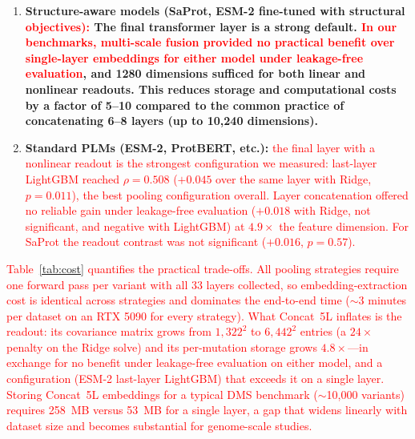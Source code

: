 \documentclass[11pt,a4paper]{article}
\newcommand{\rev}[1]{\textcolor{red}{#1}}
\begin{document}
\begin{enumerate}
    \item \textbf{Structure-aware models (SaProt, ESM-2 fine-tuned with structural
\textcolor{red}{    objectives):} The final transformer layer is a strong default. \rev{In our
    benchmarks, multi-scale fusion provided no practical benefit over single-layer
    embeddings for either model under leakage-free evaluation}, and 1280 dimensions
    sufficed for both linear and nonlinear readouts.
    This reduces
    storage and computational costs by a factor of 5--10 compared to the common
    practice of concatenating 6--8 layers (up to 10,240 dimensions).}

    \item \textbf{Standard PLMs (ESM-2, ProtBERT, etc.):} \rev{the final layer
\textcolor{red}{    with a nonlinear readout is the strongest configuration we measured:
    last-layer LightGBM reached $\rho = 0.508$ ($+0.045$ over the same layer
    with Ridge, $p = 0.011$), the best pooling configuration overall. Layer
    concatenation offered no reliable gain under leakage-free evaluation
    ($+0.018$ with Ridge, not significant, and negative with LightGBM) at
    $4.9\times$ the feature dimension. For SaProt the readout contrast was not
    significant ($+0.016$, $p = 0.57$).}}
\end{enumerate}

\textcolor{red}{Table~\ref{tab:cost} quantifies the practical trade-offs. \rev{All pooling
strategies require one forward pass per variant with all 33 layers collected,
so embedding-extraction cost is identical across strategies and dominates the
end-to-end time ($\sim$3 minutes per dataset on an RTX 5090 for every
strategy). What Concat~5L inflates is the readout: its covariance matrix
grows from $1{,}322^2$ to $6{,}442^2$ entries (a $24\times$ penalty on the
Ridge solve) and its per-mutation storage grows $4.8\times$---in exchange for
no benefit under leakage-free evaluation on
either model, and a configuration (ESM-2 last-layer LightGBM) that exceeds it
on a single layer.} Storing Concat~5L embeddings for a typical DMS
benchmark ($\sim$10,000 variants) requires 258~MB versus 53~MB for a single
layer, a gap that widens linearly with dataset size and becomes substantial
for genome-scale studies.}
\end{document}

